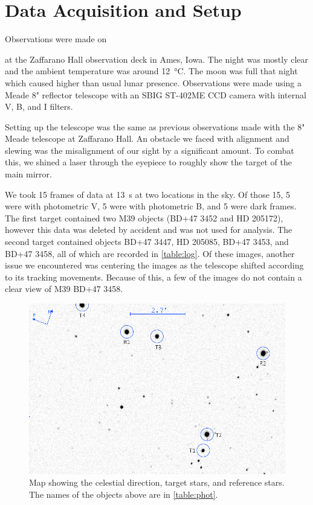 \documentclass[%
aip,
jmp,
reprint,
floatfix
]{revtex4-1}
\begin{document}
	\section{Data Acquisition and Setup}
	Observations were made on \date{06 September 2017} at the Zaffarano Hall observation deck in Ames, Iowa. The night was mostly clear and the ambient temperature was around \SI{12}{\degreeCelsius}. The moon was full that night which caused higher than usual lunar presence. Observations were made using a Meade 8" reflector telescope with an SBIG ST-402ME CCD camera with internal V, B, and I filters. 
	
	Setting up the telescope was the same as previous observations made with the 8" Meade telescope at Zaffarano Hall. An obstacle we faced with alignment and slewing was the misalignment of our sight by a significant amount. To combat this, we shined a laser through the eyepiece to roughly show the target of the main mirror.
	
	We took 15 frames of data at \SI{13}{\second} at two locations in the sky. Of those 15, 5 were with photometric V, 5 were with photometric B, and 5 were dark frames. The first target contained two M39 objects (BD+47 3452 and HD 205172), however this data was deleted by accident and was not used for analysis. The second target contained objects BD+47 3447, HD 205085, BD+47 3453, and BD+47 3458, all of which are recorded in \autoref{table:log}. Of these images, another issue we encountered was centering the images as the telescope shifted according to its tracking movements. Because of this, a few of the images do not contain a clear view of M39 BD+47 3458.
	
	\begin{figure}
		\includegraphics[width=\linewidth]{figs/M39_map.png}
		\caption{Map showing the celestial direction, target stars, and reference stars. The names of the objects above are in \autoref{table:phot}.}
		\label{fig:map}
			
	\end{figure}
\end{document}
